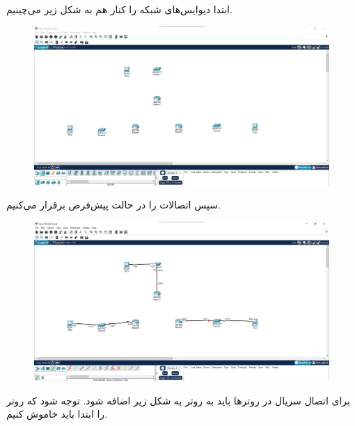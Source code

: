 \documentclass{article}
\begin{document}


\newpage



\section{}%
ابتدا دیوایس‌های شبکه را کنار هم به شکل زیر می‌چینیم.

\begin{figure}[H]
    \centering
    \includegraphics[width=1.0\textwidth]{figures/1.jpg}
    \caption{}
    \label{fig:fig1}
\end{figure}
سپس اتصالات را در حالت پیش‌فرض برقرار می‌کنیم.
\begin{figure}[H]
    \centering
    \includegraphics[width=1.0\textwidth]{figures/2.jpg}
    \caption{}
    \label{fig:fig1}
\end{figure}
برای اتصال سریال در روترها باید  به روتر به شکل زیر اضافه شود. توجه شود که روتر را ابتدا باید خاموش کنیم.
\end{document}

